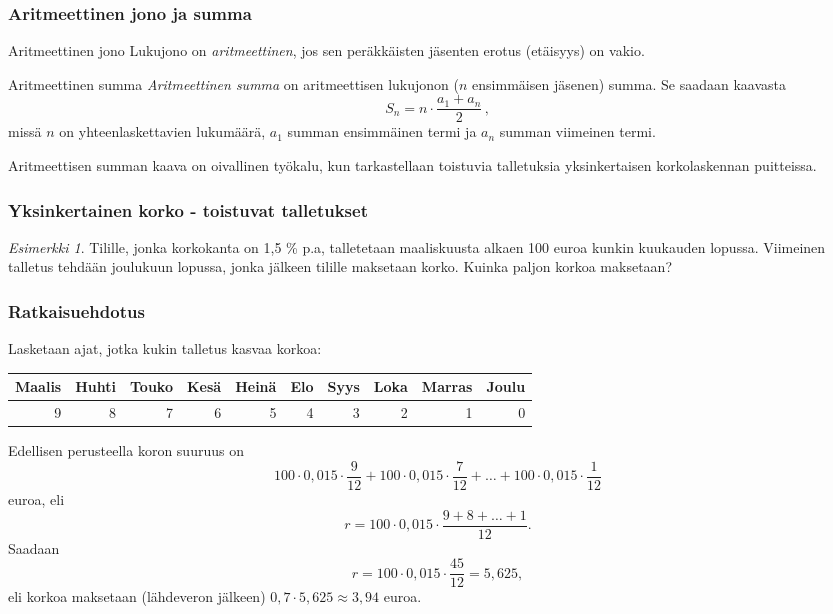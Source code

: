 \documentclass[handout]{beamer}\usepackage[]{graphicx}\usepackage[]{color}
\theoremstyle{remark}
\newtheorem{esim}{Esimerkki}
\newtheorem{ratkaisu}{Ratkaisuehdotus}
\begin{document}
\begin{frame}
    \frametitle{Aritmeettinen jono ja summa}
    \begin{block}{Aritmeettinen jono}
        Lukujono \pause on \emph{aritmeettinen}, jos sen peräkkäisten jäsenten erotus (etäisyys) on vakio.
    \end{block}
    \pause
    \begin{block}{Aritmeettinen summa}
        \emph{Aritmeettinen summa} \pause on aritmeettisen lukujonon ($n$ ensimmäisen jäsenen) summa. \pause Se saadaan kaavasta
        \[
            S_n = n \cdot \frac{a_1 + a_n}{2}\,,
        \]
        \pause missä $n$ on yhteenlaskettavien lukumäärä, \pause $a_1$ summan ensimmäinen termi ja \pause $a_n$ summan viimeinen termi.
    \end{block}
    \pause
    Aritmeettisen summan kaava on oivallinen työkalu, kun tarkastellaan toistuvia talletuksia yksinkertaisen korkolaskennan puitteissa.
\end{frame}

\begin{frame}
    \frametitle{Yksinkertainen korko - toistuvat talletukset}
    \begin{esim}
        Tilille, jonka korkokanta on 1,5 \% p.a, talletetaan maaliskuusta alkaen 100 euroa kunkin kuukauden lopussa.
        Viimeinen talletus tehdään joulukuun lopussa, jonka jälkeen tilille maksetaan korko. Kuinka paljon korkoa maksetaan?
    \end{esim}
\end{frame}

\begin{frame}
    \frametitle{Ratkaisuehdotus}
    Lasketaan ajat, jotka kukin talletus kasvaa korkoa:
  \begin{scriptsize}
\begin{table}[ht]
\centering
\begin{tabular}{rrrrrrrrrr}
  \hline
Maalis & Huhti & Touko & Kesä & Heinä & Elo & Syys & Loka & Marras & Joulu \\ 
  \hline
  9 &   8 &   7 &   6 &   5 &   4 &   3 &   2 &   1 &   0 \\ 
   \hline
\end{tabular}
\end{table}

\end{scriptsize}
  Edellisen perusteella koron suuruus on\pause 
    \[
    100\cdot0,015\cdot\frac{9}{12}+100\cdot0,015\cdot\frac{7}{12}+\ldots+100\cdot0,015\cdot\frac{1}{12}
    \]
    euroa, eli
    \[
      r =  100\cdot0,015\cdot\frac{9+8 +\dots+1}{12}.
    \]
    Saadaan
    \[
      r = 100\cdot0,015\cdot\frac{45}{12} = 5{,}625,
    \]
    eli korkoa maksetaan (lähdeveron jälkeen) \(0,7\cdot5{,}625 \approx 3{,}94\) euroa.
\end{frame}
\end{document}
